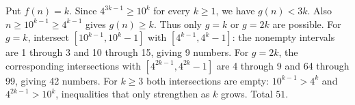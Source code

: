 Put $f(n)=k$. Since $4^{3k-1}\ge10^k$ for every $k\ge1$, we have $g(n)<3k$. Also $n\ge10^{k-1}\ge4^{k-1}$ gives $g(n)\ge k$. Thus only $g=k$ or $g=2k$ are possible. For $g=k$, intersect $[10^{k-1},10^k-1]$ with $[4^{k-1},4^k-1]$: the nonempty intervals are 1 through 3 and 10 through 15, giving 9 numbers. For $g=2k$, the corresponding intersections with $[4^{2k-1},4^{2k}-1]$ are 4 through 9 and 64 through 99, giving 42 numbers. For $k\ge3$ both intersections are empty: $10^{k-1}>4^k$ and $4^{2k-1}>10^k$, inequalities that only strengthen as $k$ grows. Total $\boxed{51}$.
